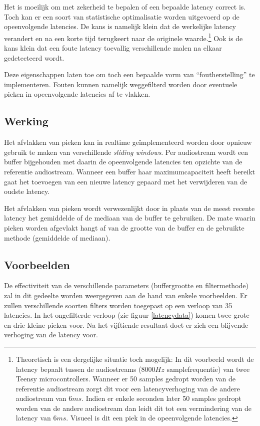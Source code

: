 Het is moeilijk om met zekerheid te bepalen of een bepaalde latency correct is. Toch kan er een soort van statistische optimalisatie worden uitgevoerd op de opeenvolgende latencies. De kans is namelijk klein dat de werkelijke latency verandert en na een korte tijd terugkeert naar de originele waarde.\footnote{Theoretisch is een dergelijke situatie toch mogelijk: In dit voorbeeld wordt de latency bepaalt tussen de audiostreams ($ 8000 Hz$ samplefrequentie) van twee Teensy microcontrollers. Wanneer er 50 samples gedropt worden van de referentie audiostream zorgt dit voor een latencyverhoging van de andere audiostream van $6 ms$. Indien er enkele seconden later 50 samples gedropt worden van de andere audiostream dan leidt dit tot een vermindering van de latency van $ 6 ms $. Visueel is dit een piek in de opeenvolgende latencies.} Ook is de kans klein dat een foute latency toevallig verschillende malen na elkaar gedetecteerd wordt.

Deze eigenschappen laten toe om toch een bepaalde vorm van ``foutherstelling'' te implementeren. Fouten kunnen namelijk weggefilterd worden door eventuele pieken in opeenvolgende latencies af te vlakken.

\subsection{Werking}

Het afvlakken van pieken kan in realtime geïmplementeerd worden door opnieuw gebruik te maken van verschillende \textit{sliding windows}. Per audiostream wordt een buffer bijgehouden met daarin de opeenvolgende latencies ten opzichte van de referentie audiostream. Wanneer een buffer haar maximumcapaciteit heeft bereikt gaat het toevoegen van een nieuwe latency gepaard met het verwijderen van de oudste latency.

Het afvlakken van pieken wordt verwezenlijkt door in plaats van de meest recente latency het gemiddelde of de mediaan van de buffer te gebruiken. De mate waarin pieken worden afgevlakt hangt af van de grootte van de buffer en de gebruikte methode (gemiddelde of mediaan).

\subsection{Voorbeelden}

De effectiviteit van de verschillende parameters (buffergrootte en filtermethode) zal in dit gedeelte worden weergegeven aan de hand van enkele voorbeelden. Er zullen verschillende soorten filters worden toegepast op een verloop van 35 latencies. In het ongefilterde verloop (zie figuur \ref{latencydata}) komen twee grote en drie kleine pieken voor. Na het vijftiende resultaat doet er zich een blijvende verhoging van de latency voor.

